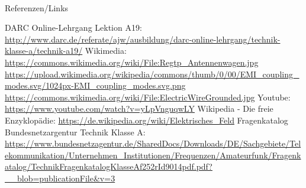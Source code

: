 \renewcommand{\refname}{Referenzen}

\hypertarget{refs}{}
\textcolor{white}{} \\ %
\Large Referenzen/Links
\footnotesize

\begin{thebibliography}{}
      DARC Online-Lehrgang Lektion A19:
                    \url{http://www.darc.de/referate/ajw/ausbildung/darc-online-lehrgang/technik-klasse-a/technik-a19/}
     	Wikimedia:
                    \url{https://commons.wikimedia.org/wiki/File:Regtp_Antennenwagen.jpg}
                    \url{https://upload.wikimedia.org/wikipedia/commons/thumb/0/00/EMI_coupling_modes.svg/1024px-EMI_coupling_modes.svg.png}
                    \url{https://commons.wikimedia.org/wiki/File:ElectricWireGrounded.jpg}
      Youtube:
                    \url{https://www.youtube.com/watch?v=yLpVnguqwLY}
        Wikipedia - Die freie Enzyklopädie:
                    \url{https://de.wikipedia.org/wiki/Elektrisches_Feld}
	   Fragenkatalog Bundesnetzargentur Technik Klasse A:                   
                    \url{https://www.bundesnetzagentur.de/SharedDocs/Downloads/DE/Sachgebiete/Telekommunikation/Unternehmen_Institutionen/Frequenzen/Amateurfunk/Fragenkatalog/TechnikFragenkatalogKlasseAf252rId9014pdf.pdf?__blob=publicationFile&v=3}
\end{thebibliography} 


